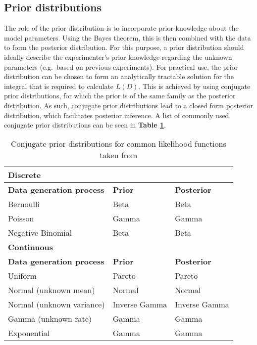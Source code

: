 \newpage

\subsection{Prior distributions}
\label{sec0:prior}

The role of the prior distribution is to incorporate prior knowledge about the model parameters. Using the Bayes theorem, this is then combined with the data to form the posterior distribution. For this purpose, a prior distribution should ideally describe the experimenter's prior knowledge regarding the unknown parameters (e.g.~based on previous experiments). For practical use, the prior distribution can be chosen to form an analytically tractable solution for the integral that is required to calculate $L(D)$. This is achieved by using conjugate prior distributions, for which the prior is of the same family as the posterior distribution. As such, conjugate prior distributions lead to a closed form posterior distribution, which facilitates posterior inference. A list of commonly used conjugate prior distributions can be seen in \textbf{Table \ref{tab0:priors}}.

\begin{table}[hb	]
\centering
\caption{Conjugate prior distributions for common likelihood functions taken from \citep{Fink1997}}
\label{tab0:priors}
\begin{tabular}{l l l}
\toprule
\textbf{Discrete} & &\\
\midrule
\midrule
\textbf{Data generation process} & \textbf{Prior} & \textbf{Posterior} \\ 
\midrule 
Bernoulli & Beta & Beta \\
Poisson & Gamma  & Gamma \\
Negative Binomial & Beta & Beta \\
\midrule
\midrule
\textbf{Continuous} & & \\
\midrule
\midrule
\textbf{Data generation process} & \textbf{Prior} & \textbf{Posterior} \\ 
\midrule
Uniform  & Pareto & Pareto \\ 
Normal (unknown mean) &  Normal  & Normal \\ 
Normal (unknown variance) &  Inverse Gamma  & Inverse Gamma \\ 
Gamma (unknown rate) &  Gamma  & Gamma \\ 
Exponential &  Gamma  & Gamma \\ 
\bottomrule
\end{tabular}
\end{table} 

